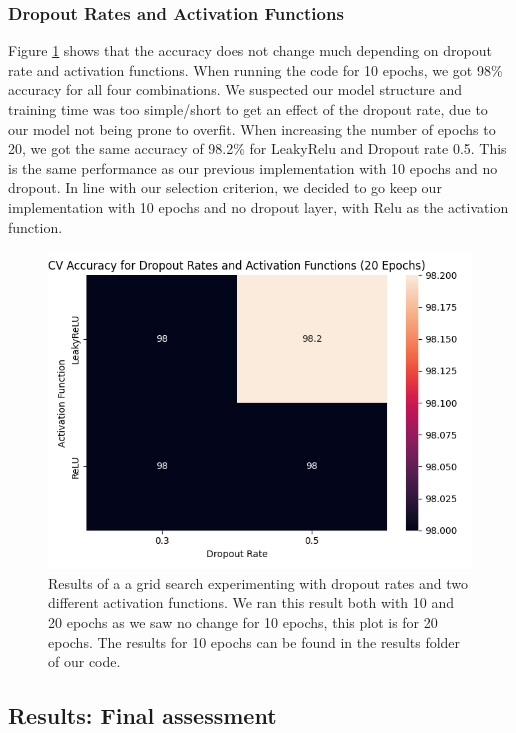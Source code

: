 \newpage
\subsubsection{Dropout Rates and Activation Functions}
 Figure \ref{fig:cnn_pp} shows that the accuracy does not change much depending on dropout rate and activation functions. When running the code for 10 epochs, we got 98\% accuracy for all four combinations. We suspected our model structure and training time was too simple/short to get an effect of the dropout rate, due to our model not being prone to overfit. When increasing the number of epochs to 20, we got the same accuracy of 98.2\% for LeakyRelu and Dropout rate 0.5. This is the same performance as our previous implementation with 10 epochs and no dropout. In line with our selection criterion, we decided to go keep our implementation with 10 epochs and no dropout layer, with Relu as the activation function. 

\begin{figure}[h]
    \centering
    \includegraphics[width=\linewidth]{results/cnn_grid_search/heatmap_grid_search_da.png}
    \caption{Results of a a grid search experimenting with dropout rates and two different activation functions. We ran this result both with 10 and 20 epochs as we saw no change for 10 epochs, this plot is for 20 epochs. The results for 10 epochs can be found in the results folder of our code.}
    \label{fig:cnn_pp}
\end{figure}

\subsection{Results: Final assessment}

